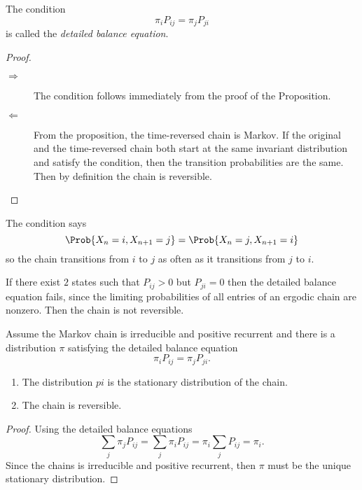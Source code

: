 \documentclass[12pt]{article}
\begin{document}
\begin{remark}
  The condition
  \[
    \pi_i P_{ij} = \pi_j P_{ji}
  \]
  is called the \emph{detailed balance equation}.
\end{remark}
\begin{proof}
  \begin{description}
  \item[$\Rightarrow$] The condition follows immediately from the
    proof of the Proposition.
  \item[$\Leftarrow$] From the proposition, the time-reversed chain is
    Markov.  If the original and the time-reversed chain both
    start at the same invariant distribution and satisfy the
    condition, then the transition probabilities are the same.  Then
    by definition the chain is reversible. 
  \end{description}
\end{proof}

\begin{remark}
  The condition says
  \[
    \Prob{X_n =i, X_{n+1} = j} = \Prob{X_n =j, X_{n+1} = i}
  \]
  so the chain transitions from $i$ to $j$ as often as it transitions
  from $j$ to $i$.
\end{remark}

\begin{remark}
  If there exist $2$ states such that $P_{ij} > 0$ but $P_{ji} = 0$
  then the detailed balance equation fails, since the limiting probabilities of all
entries of an ergodic chain are nonzero. 
  Then the chain is not reversible.
\end{remark}

\begin{theorem}
  Assume the Markov chain is irreducible and positive recurrent and
  there is a distribution $\pi$ satisfying the detailed balance equation
  \[
    \pi_i P_{ij} = \pi_j P_{ji}.
  \]
  \begin{enumerate}
  \item The distribution $pi$ is the stationary distribution of the chain.
  \item The chain is reversible.
  \end{enumerate}
\end{theorem}

\begin{proof}
  Using the detailed balance equations
  \[
    \sum_j \pi_j P_{ij} = \sum_j \pi_i P_{ij} = \pi_i \sum_j P_{ij} =
    \pi_i.
  \]
  Since the chains is irreducible and positive recurrent, then $\pi$
  must be the unique stationary distribution.
\end{proof}
\end{document}
